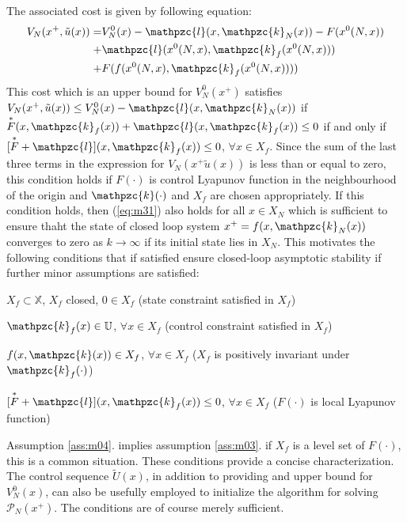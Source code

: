 \noindent The associated cost is given by following equation:
\begin{equation}
    \begin{split}
        V_N(x^+,\tilde{u}(x)) = & V_N^0(x) - \mathpzc{l}(x,\mathpzc{k}_N(x))-F(x^0(N,x))\\
         +& \mathpzc{l}(x^0(N,x),\mathpzc{k}_f(x^0(N,x)))\\
         +& F(f(x^0(N,x),\mathpzc{k}_f(x^0(N,x))))
    \end{split}
\end{equation}
\noindent This cost which is an upper bound for $V_N^0(x^+)$ satisfies $V_N(x^+,\tilde{u}(x))\le V_N^0(x)-\mathpzc{l}(x,\mathpzc{k}_N(x))$ if $\overset{\ast}{F}(x,\mathpzc{k}_f(x))+\mathpzc{l}(x,\mathpzc{k}_f(x))\le 0$ if and only if $[\overset{\ast}{F}+\mathpzc{l}](x,\mathpzc{k}_f(x))\le 0$, $\forall x \in X_f$. Since the sum of the last three terms in the expression for $V_N(x^+\tilde{u}(x))$ is less than or equal to zero, this condition holds if $F(\cdot)$ is control Lyapunov function in the neighbourhood of the origin and $\mathpzc{k}(\cdot)$ and $X_f$ are chosen appropriately. If this condition holds, then (\ref{eq:m31}) also holds for all $x\in X_N$ which is sufficient to ensure thaht the state of closed loop system $x^+=f(x,\mathpzc{k}_N(x))$ converges to zero as $k\to\infty$ if its initial state lies in $X_N$. This motivates the following conditions that if satisfied ensure closed-loop  asymptotic stability if further minor assumptions are satisfied:

\begin{assumption}{$X_f \subset \mathbb{X}$, $X_f$ closed, $0\in X_f$ (state constraint satisfied in $X_f$)}\label{ass:m01}\end{assumption}
\begin{assumption}{$\mathpzc{k}_f(x)\in\mathbb{U}$, $\forall x \in X_f$ (control constraint satisfied in $X_f$)}\label{ass:m02}\end{assumption}
\begin{assumption}{$f(x,\mathpzc{k}(x))\in X_f$, $\forall x\in X_f$ ($X_f$ is positively invariant under $\mathpzc{k}_f(\cdot)$)}\label{ass:m03}\end{assumption}
\begin{assumption}{$[\overset{\ast}{F}+\mathpzc{l}](x,\mathpzc{k}_f(x)) \le 0$, $\forall x\in X_f$ ($F(\cdot)$ is local Lyapunov function)}\label{ass:m04}\end{assumption}

\noindent Assumption \ref{ass:m04}. implies assumption \ref{ass:m03}. if $X_f$ is a level set of $F(\cdot)$, this is a common situation. These conditions provide a concise characterization. The control sequence $\tilde{U}(x)$, in addition to providing and upper bound for $V_N^0(x)$, can also be usefully employed to initialize the algorithm for solving $\mathscr{P}_N(x^+)$. The conditions are of course merely sufficient.


